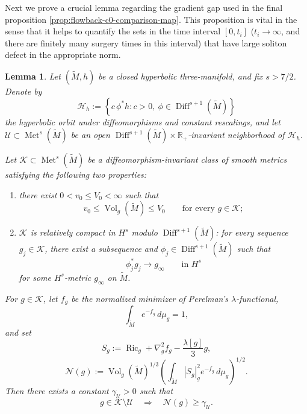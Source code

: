 \documentclass{amsart}
\newtheorem{lemma}{Lemma}[section]
\begin{document}
\noindent Next we prove a crucial lemma regarding the gradient gap used in the final proposition \ref{prop:flowback-c0-comparison-map}. This proposition is vital in the sense that it helps to quantify the sets in the time interval $[0,t_{i}]$ ($t_{i}\to\infty$, and there are finitely many surgery times in this interval) that have large soliton defect in the appropriate norm. 





\begin{lemma}
\label{lem:uniform-soliton-defect-gap}
Let \((\widetilde M,h)\) be a closed hyperbolic three-manifold, and
fix \(s>7/2\). Denote by
\[
        \mathscr H_h
        :=
        \left\{
                c\,\phi^*h:
                c>0,\ 
                \phi\in\operatorname{Diff}^{s+1}(\widetilde M)
        \right\}
\]
the hyperbolic orbit under diffeomorphisms and constant rescalings,
and let
$\mathcal U\subset\operatorname{Met}^s(\widetilde M)$
be an open
\(\operatorname{Diff}^{s+1}(\widetilde M)\times\mathbb R_+\)-invariant
neighborhood of \(\mathscr H_h\).

\noindent Let \(\mathscr K\subset\operatorname{Met}^s(\widetilde M)\) be a
diffeomorphism-invariant class of smooth metrics satisfying the
following two properties:
\begin{enumerate}
\item there exist \(0<v_0\leq V_0<\infty\) such that
\[
        v_0
        \leq
        \operatorname{Vol}_g(\widetilde M)
        \leq
        V_0
        \qquad\text{for every }g\in\mathscr K;
\]
\item \(\mathscr K\) is relatively compact in \(H^s\) modulo
\(\operatorname{Diff}^{s+1}(\widetilde M)\): for every sequence
\(g_j\in\mathscr K\), there exist a subsequence and
\(\phi_j\in\operatorname{Diff}^{s+1}(\widetilde M)\) such that
\[
        \phi_j^*g_j\longrightarrow g_\infty
        \qquad\text{in }H^s
\]
for some \(H^s\)-metric \(g_\infty\) on \(\widetilde M\).
\end{enumerate}

\noindent For \(g\in\mathscr K\), let \(f_g\) be the normalized minimizer of
Perelman's \(\lambda\)-functional,
\[
        \int_{\widetilde M}e^{-f_g}\,d\mu_g=1,
\]
and set
\[
        S_g
        :=
        \operatorname{Ric}_g+\nabla_g^2f_g
        -\frac{\lambda[g]}{3}g,
\]
\[
        \mathcal N(g)
        :=
        \operatorname{Vol}_g(\widetilde M)^{1/3}
        \left(
        \int_{\widetilde M}
        |S_g|_g^2e^{-f_g}\,d\mu_g
        \right)^{1/2}.
\]
Then there exists a constant
$\gamma_{\mathcal U}>0$
such that
\begin{equation}
\label{eq:uniform-soliton-defect-gap}
        g\in\mathscr K\setminus\mathcal U
        \quad\Longrightarrow\quad
        \mathcal N(g)\geq\gamma_{\mathcal U}.
\end{equation}
\end{lemma}
\end{document}
